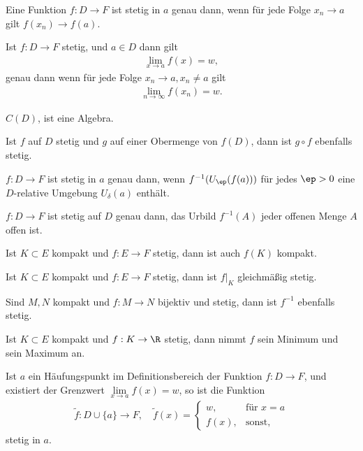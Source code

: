 \begin{prop}[Folgenkriterium]
Eine Funktion $f: D\to F$ ist stetig in $a$ genau dann, wenn für jede Folge
$x_n \to a$ gilt $f(x_n) \to f(a)$.
\end{prop}
\begin{prop}
Ist $f: D\to F$ stetig, und $a\in D$ dann gilt 
\begin{align*}
\lim \limits_{x\to a} f(x) = w,
\end{align*}
genau dann wenn für jede Folge $x_n \to a, x_n\neq a$ gilt
\begin{align*}
\lim \limits_{n\to\infty} f(x_n) = w.
\end{align*}
\end{prop}
\begin{prop}
$C(D)$, ist eine Algebra.
\end{prop}
\begin{prop}
Ist $f$ auf $D$ stetig und $g$ auf einer Obermenge von $f(D)$, dann ist $g\circ
f$ ebenfalls stetig.
\end{prop}
\begin{prop}
$f: D\to F$ ist stetig in $a$ genau dann, wenn $f^{-1}(U_\ep(f(a)))$ für jedes
$\ep > 0$ eine $D$-relative Umgebung $U_\delta(a)$ enthält.
\end{prop}
\begin{prop}
$f: D\to F$ ist stetig auf $D$ genau dann, das Urbild $f^{-1}(A)$ jeder
offenen Menge $A$ offen ist.
\end{prop}
\begin{prop}
Ist $K\subset E$ kompakt und $f: E\to F$ stetig, dann ist auch $f(K)$
kompakt.
\end{prop}
\begin{prop}
Ist $K\subset E$ kompakt und $f: E\to F$ stetig, dann ist $f\big|_K$
gleichmäßig stetig.
\end{prop}
\begin{prop}
Sind $M,N$ kompakt und $f: M\to N$ bijektiv und stetig, dann ist $f^{-1}$
ebenfalls stetig.
\end{prop}
\begin{prop}
Ist $K\subset E$ kompakt und $f: K\to \R$ stetig, dann nimmt $f$ sein Minimum
und sein Maximum an.
\end{prop}
\begin{prop}
Ist $a$ ein Häufungspunkt im Definitionsbereich der Funktion $f: D\to F$, und
existiert der Grenzwert $\lim \limits_{x\to a} f(x) = w$, so ist die Funktion
\begin{align*}
\tilde{f}: D\cup \{a\} \to F,\quad \tilde{f}(x) = \begin{cases}w, & \text{für }
x = a\\ f(x), & \text{sonst},
       \end{cases}
\end{align*}
stetig in $a$.
\end{prop}

